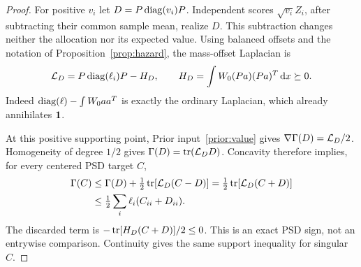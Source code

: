 \begin{proof}
For positive $v_i$ let $D=P\operatorname{diag}(v_i)P$. Independent scores
$\sqrt{v_i}Z_i$, after subtracting their common sample mean, realize
$D$. This subtraction changes neither the allocation nor its expected
value. Using balanced offsets and the notation of
Proposition~\ref{prop:hazard}, the mass-offset Laplacian is
\begin{equation}\label{eq:hazard-matrix}
 \mathcal L_D=P\operatorname{diag}(\ell_i)P-H_D,\qquad
 H_D=\int W_0(Pa)(Pa)^T\,\mathrm d x\succeq0.
\end{equation}
Indeed $\operatorname{diag}(\ell)-\int W_0aa^T$ is exactly the ordinary Laplacian,
which already annihilates $\mathbf 1$.

At this positive supporting point, Prior input~\ref{prior:value} gives
$\nabla\Gamma(D)=\mathcal L_D/2$. Homogeneity of degree $1/2$ gives
$\Gamma(D)=\operatorname{tr}(\mathcal L_DD)$. Concavity therefore implies, for every
centered PSD target $C$,
\begin{align}
 \Gamma(C)&\le\Gamma(D)+\tfrac12\operatorname{tr}[\mathcal L_D(C-D)]
       =\tfrac12\operatorname{tr}[\mathcal L_D(C+D)]\notag\\
       &\le\tfrac12\sum_i\ell_i(C_{ii}+D_{ii}).
       \label{eq:support}
\end{align}
The discarded term is $-\operatorname{tr}[H_D(C+D)]/2\le0$.
This is an exact PSD sign, not an entrywise comparison. Continuity
gives the same support inequality for singular $C$.


\end{proof}
